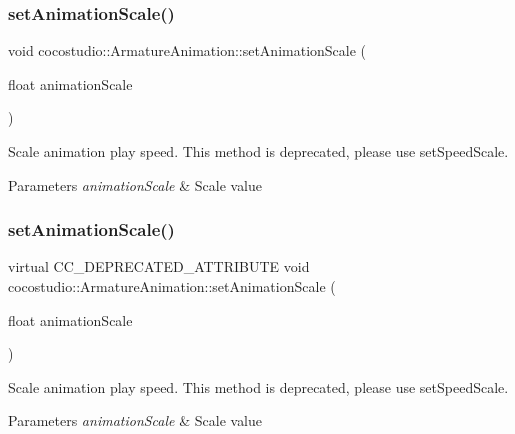 \subsubsection{\texorpdfstring{set\+Animation\+Scale()}{setAnimationScale()}\hspace{0.1cm}{\footnotesize\ttfamily [1/2]}}
{\footnotesize\ttfamily void cocostudio\+::\+Armature\+Animation\+::set\+Animation\+Scale (\begin{DoxyParamCaption}\item[{float}]{animation\+Scale }\end{DoxyParamCaption})\hspace{0.3cm}{\ttfamily [virtual]}}

Scale animation play speed. This method is deprecated, please use set\+Speed\+Scale. 
\begin{DoxyParams}{Parameters}
{\em animation\+Scale} & Scale value \\
\hline
\end{DoxyParams}
\mbox{\label{classcocostudio_1_1ArmatureAnimation_a86591b66d60783d015712feea1da75c0}} 
\subsubsection{\texorpdfstring{set\+Animation\+Scale()}{setAnimationScale()}\hspace{0.1cm}{\footnotesize\ttfamily [2/2]}}
{\footnotesize\ttfamily virtual C\+C\+\_\+\+D\+E\+P\+R\+E\+C\+A\+T\+E\+D\+\_\+\+A\+T\+T\+R\+I\+B\+U\+TE void cocostudio\+::\+Armature\+Animation\+::set\+Animation\+Scale (\begin{DoxyParamCaption}\item[{float}]{animation\+Scale }\end{DoxyParamCaption})\hspace{0.3cm}{\ttfamily [virtual]}}

Scale animation play speed. This method is deprecated, please use set\+Speed\+Scale. 
\begin{DoxyParams}{Parameters}
{\em animation\+Scale} & Scale value \\
\hline
\end{DoxyParams}
\mbox{\label{classcocostudio_1_1ArmatureAnimation_a5dd6446c9e00011e55b852d060c280f5}} 
